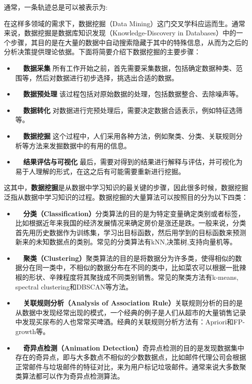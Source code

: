 通常，一条轨迹总是可以被表示为:




在这样多领域的需求下，数据挖掘（Data Mining）这门交叉学科应运而生。通常来说，数据挖掘是数据库知识发现（Knowledge-Discovery in Databases）中的一个步骤，其目的是在大量的数据中自动搜索隐藏于其中的特殊信息，从而为之后的分析决策提供理论依据。下面将简要介绍下数据挖掘的主要步骤：
\vspace{4mm}
\begin{itemize}
    \item \textbf{~~数据采集} 所有工作开始之前，首先需要采集数据，包括确定数据种类、范围等，然后对数据进行初步选择，挑选出合适的数据。
    \item \textbf{~~数据预处理} 该过程包括对原始数据的处理，包括数据整合、去除噪声等。
    \item \textbf{~~数据转化} 对数据进行完预处理后，需要决定数据合适表示，例如特征选筛等。
    \item \textbf{~~数据挖掘} 这个过程中，人们采用各种方法，例如聚类、分类、关联规则分析等方法来发掘数据中的有用的信息。
    \item \textbf{~~结果评估与可视化} 最后，需要对得到的结果进行解释与评估，并可视化为易于人理解的形式，在这之后有可能需要重新进行挖掘。
\end{itemize}

\vspace{2mm}
这其中，\textbf{数据挖掘}是从数据中学习知识的最关键的步骤，因此很多时候，数据挖掘泛指从数据中学习知识的过程。数据挖掘的大量算法可以按照目的分为以下四类：

\begin{itemize}
    \item \textbf{~~分类（Classification）}分类算法的目的是为特定变量确定类别或者标签，比如根据近年来我国的经济发展情况来确定房价是涨还是跌。一般来说，分类首先用历史数据作为训练集，学习出目标函数，然后用学到的目标函数来预测新来的未知数据点的类别。常见的分类算法有kNN,决策树,支持向量机等。
    \item \textbf{~~聚类（Clustering）}聚类算法的目的是将数据分为许多类，使得相似的数据分在同一类中，不相似的数据分布在不同的类中，比如菜农可以根据一批辣椒的形状、辛辣程度将其聚拢成不同类别销售。常见的聚类方法有k-means, spectral clustering和DBSCAN等方法。
    \item \textbf{~~关联规则分析（Analysis of Association Rule）}关联规则分析的目的是从数据中发现经常出现的模式，一个经典的例子是人们从超市的大量销售记录中发现买尿布的人也常常买啤酒。经典的关联规则分析方法有：Apriori和FP-growth等。
    \item \textbf{~~奇异点检测（Animation Detection）}奇异点检测的目的是发现数据集中存在的奇异点，即与大多数点不相似的少数数据点，比如邮件代理公司会根据正常邮件与垃圾邮件的特征对比，来为用户标记垃圾邮件。通常来说大多数聚类算法都可以作为奇异点检测算法。
\end{itemize}


